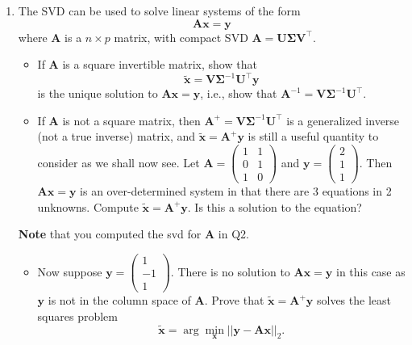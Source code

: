 \documentclass[
]{book}
\providecommand{\tightlist}{%
  \setlength{\itemsep}{0pt}\setlength{\parskip}{0pt}}
\theoremstyle{definition}
\theoremstyle{definition}
\theoremstyle{definition}
\theoremstyle{definition}
\theoremstyle{remark}
\begin{document}
\begin{enumerate}
\def\labelenumi{\arabic{enumi}.}
\setcounter{enumi}{3}
\item
  The SVD can be used to solve linear systems of the form
  \[\mathbf A\mathbf x= \mathbf y\]
  where \(\mathbf A\) is a \(n\times p\) matrix, with compact SVD
  \(\mathbf A= \mathbf U\boldsymbol{\Sigma}\mathbf V^\top\).

  \begin{itemize}
  \item
    If \(\mathbf A\) is a square invertible matrix, show that \[\tilde{\mathbf x} = \mathbf V\boldsymbol{\Sigma}^{-1} \mathbf U^\top \mathbf y\] is the unique solution to \(\mathbf A\mathbf x= \mathbf y\), i.e., show that \(\mathbf A^{-1} =  \mathbf V\boldsymbol{\Sigma}^{-1} \mathbf U^\top\).
  \item
    If \(\mathbf A\) is not a square matrix, then \(\mathbf A^+ = \mathbf V\boldsymbol{\Sigma}^{-1} \mathbf U^\top\) is a generalized inverse (not a true inverse) matrix, and
    \(\tilde{\mathbf x}=\mathbf A^+\mathbf y\) is still a useful quantity to consider as we shall now see. Let \(\mathbf A=\left(\begin{array}{cc}1&1\\0&1\\1&0\end{array}
    \right)\) and \(\mathbf y= \left(\begin{array}{c}2\\1\\1\end{array}
    \right)\). Then \(\mathbf A\mathbf x=\mathbf y\) is an over-determined system in that there are 3 equations in 2 unknowns. Compute \(\tilde{\mathbf x}=\mathbf A^+\mathbf y\). Is this a solution to the equation?
  \end{itemize}

  \textbf{Note} that you computed the svd for \(\mathbf A\) in Q2.

  \begin{itemize}
  \tightlist
  \item
    Now suppose \(\mathbf y= \left(\begin{array}{c}1\\-1\\1\end{array}
    \right)\). There is no solution to \(\mathbf A\mathbf x=\mathbf y\) in this case as \(\mathbf y\) is not in the column space of \(\mathbf A\). Prove that \({\tilde{\mathbf x}} = \mathbf A^+\mathbf y\) solves the least squares problem
    \[\tilde{\mathbf x} = \arg\min_{\mathbf x}||\mathbf y- \mathbf A\mathbf x||_2.\]
  \end{itemize}


\end{enumerate}
\end{document}
